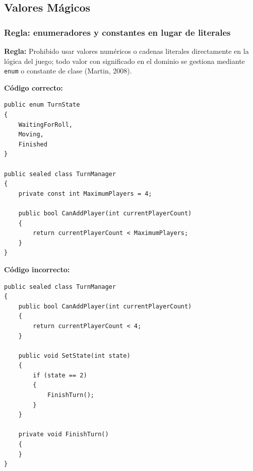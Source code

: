 \subsection{Valores Mágicos}

\subsubsection{Regla: enumeradores y constantes en lugar de literales}

\textbf{Regla:} Prohibido usar valores numéricos o cadenas literales directamente en la lógica del juego; todo valor con significado en el dominio se gestiona mediante \texttt{enum} o constante de clase (Martin, 2008).

\textbf{Código correcto:}
\begin{lstlisting}[style=csharpstyle]
public enum TurnState
{
    WaitingForRoll,
    Moving,
    Finished
}

public sealed class TurnManager
{
    private const int MaximumPlayers = 4;

    public bool CanAddPlayer(int currentPlayerCount)
    {
        return currentPlayerCount < MaximumPlayers;
    }
}
\end{lstlisting}

\textbf{Código incorrecto:}
\begin{lstlisting}[style=csharpstyle]
public sealed class TurnManager
{
    public bool CanAddPlayer(int currentPlayerCount)
    {
        return currentPlayerCount < 4;
    }

    public void SetState(int state)
    {
        if (state == 2)
        {
            FinishTurn();
        }
    }

    private void FinishTurn()
    {
    }
}
\end{lstlisting}
